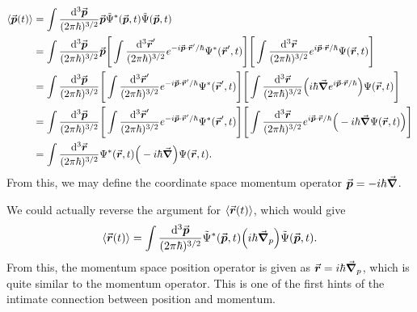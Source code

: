 \begin{eqnarray}
    \begin{aligned}
        \expval{\va*{p}(t)} &= \int \frac{\dd[3]{\va*{p}}}{(2 \pi \hbar)^{3/2}} \va*{p} \tilde{\Psi}^{*}(\va*{p},t) \tilde{\Psi}(\va*{p},t) \\
                            &= \int \frac{\dd[3]{\va*{p}}}{(2 \pi \hbar)^{3/2}} \va*{p} \Bigg[ \int \frac{\dd[3]{\va*{r}'}}{(2 \pi \hbar)^{3/2}} e^{-i \va*{p} \cdot \va*{r}' / \hbar} \Psi^{*}(\va*{r}',t) \Bigg] \Bigg[ \int \frac{\dd[3]{\va*{r}}}{(2 \pi \hbar)^{3/2}} e^{i \va*{p} \cdot \va*{r} / \hbar} \Psi(\va*{r},t) \Bigg] \\
                            &= \int \frac{\dd[3]{\va*{p}}}{(2 \pi \hbar)^{3/2}} \Bigg[ \int \frac{\dd[3]{\va*{r}'}}{(2 \pi \hbar)^{3/2}} e^{-i \va*{p} \cdot \va*{r}' / \hbar} \Psi^{*}(\va*{r}',t) \Bigg] \Bigg[ \int \frac{\dd[3]{\va*{r}}}{(2 \pi \hbar)^{3/2}} \Big( i\hbar \grad e^{i \va*{p} \cdot \va*{r} / \hbar} \Big) \Psi(\va*{r},t) \Bigg] \\
                            &= \int \frac{\dd[3]{\va*{p}}}{(2 \pi \hbar)^{3/2}} \Bigg[ \int \frac{\dd[3]{\va*{r}'}}{(2 \pi \hbar)^{3/2}} e^{-i \va*{p} \cdot \va*{r}' / \hbar} \Psi^{*}(\va*{r}',t) \Bigg] \Bigg[ \int \frac{\dd[3]{\va*{r}}}{(2 \pi \hbar)^{3/2}} e^{i \va*{p} \cdot \va*{r} / \hbar} \Big( -i\hbar \grad \Psi(\va*{r},t) \Big) \Bigg] \\
                            &= \int \frac{\dd[3]{\va*{r}}}{(2 \pi \hbar)^{3/2}} \Psi^{*}(\va*{r},t) \Big( -i \hbar \grad \Big) \Psi(\va*{r},t)
    .\end{aligned}
\end{eqnarray}
From this, we may define the coordinate space momentum operator $\va*{p} = -i \hbar \grad$.

We could actually reverse the argument for $\expval{\va*{r}(t)}$, which would give
\begin{eqnarray}
    \expval{\va*{r}(t)} = \int \frac{\dd[3]{\va*{p}}}{(2 \pi \hbar)^{3/2}} \tilde{\Psi}^{*}(\va*{p},t) \Big( i \hbar \grad_{p} \Big) \tilde{\Psi}(\va*{p},t)
.\end{eqnarray}
From this, the momentum space position operator is given as $\va*{r} = i \hbar \grad_{p}$, which is quite similar to the momentum operator.
This is one of the first hints of the intimate connection between position and momentum.





